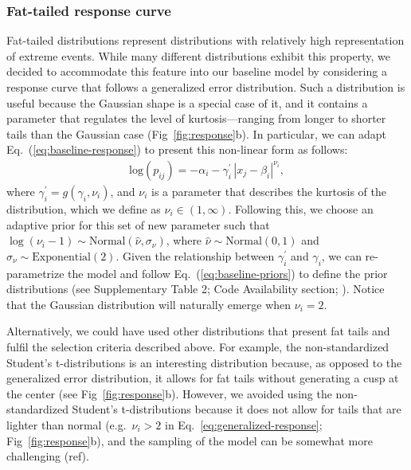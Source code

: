\documentclass[11pt, a4paper]{article}
\begin{document}
\subsubsection*{Fat-tailed response curve}
Fat-tailed distributions represent distributions with relatively high representation of extreme events. While many different distributions exhibit this property, we decided to accommodate this feature into our baseline model by considering a response curve that follows a generalized error distribution. Such a distribution is useful because the Gaussian shape is a special case of it, and it contains a parameter that regulates the level of kurtosis---ranging from longer to shorter tails than the Gaussian case (Fig~\ref{fig:response}b). In particular, we can adapt Eq.~(\ref{eq:baseline-response}) to present this non-linear form as follows:
\begin{equation}
\begin{split}
\text{log}\left(p_{ij}\right) = -\alpha_{i} - \gamma^{\prime}_{i}\, |x_{j}-\beta_{i}|^{\nu_{i}} ,
\end{split}
\label{eq:generalized-response}
\end{equation}
where $\gamma^{\prime}_{i} = g(\gamma_{i}, \nu_{i})$, and $\nu_{i}$ is a parameter that describes the kurtosis of the distribution, which we define as $\nu_{i}\in\left(1, \infty\right)$. Following this, we choose an adaptive prior for this set of new parameter such that $\log\left(\nu_{i}-1\right)\sim \text{Normal}\left(\hat{\nu}, \sigma_{\nu}\right)$, where $\hat{\nu}\sim\text{Normal}\left(0, 1\right)$ and $\sigma_{\nu}\sim\text{Exponential}\left(2\right)$. Given the relationship between $\gamma^{\prime}_{i}$ and $\gamma_{i}$,  we can re-parametrize the model and follow Eq.~(\ref{eq:baseline-priors}) to define the prior distributions (see Supplementary Table 2; Code Availability section; \citealt{nadarajahGeneralizedNormalDistribution2005}). Notice that the Gaussian distribution will naturally emerge when $\nu_i=2$.

Alternatively, we could have used other distributions that present fat tails and fulfil the selection criteria described above. For example, the non-standardized Student's t-distributions is an interesting distribution because, as opposed to the generalized error distribution, it allows for fat tails without generating a cusp at the center (see Fig~\ref{fig:response}b). However, we avoided using the non-standardized Student's t-distributions because it does not allow for tails that are lighter than normal (e.g.~$\nu_i>2$ in Eq.~\ref{eq:generalized-response}; Fig~\ref{fig:response}b), and the sampling of the model can be somewhat more challenging (ref). 
\end{document}
